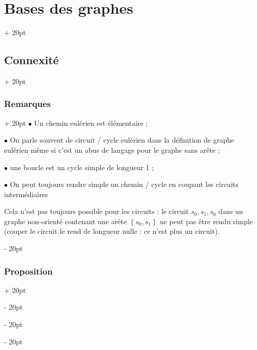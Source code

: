 \documentclass[a4paper, 12pt, twoside]{article}
\newcommand{\set}[1]{\left\{ #1 \right\}}
\newcommand{\ind}[1][20pt]{\advance\leftskip + #1}
\newcommand{\deind}[1][20pt]{\advance\leftskip - #1}
\newenvironment{indt}[2][20pt]{#2 \par \ind[#1]}{\par \deind} %
\begin{document}
\begin{indt}{\section{Bases des graphes}}
\begin{indt}{\subsection{Connexité}}
            \vspace{12pt}
            
            \begin{indt}{\subsubsection{Remarques}}
                $\bullet$ Un chemin eulérien est élémentaire ;

                $\bullet$ On parle souvent de circuit / cycle eulérien dans la définition de graphe eulérien même si c'est un abus de langage pour le graphe sans arête ;

                $\bullet$ une boucle est un cycle simple de longueur 1 ;

                $\bullet$ On peut toujours rendre simple un chemin / cycle en coupant les circuits intermédiaires

                \begin{center}
                \end{center}

                Cela n'est pas toujours possible pour les circuits : le circuit $s_0, s_1, s_0$ dans un graphe non-orienté contenant une arête $\set{s_0, s_1}$ ne peut pas être rendu simple (couper le circuit le rend de longueur nulle : ce n'est plus un circuit).
            \end{indt}

            \vspace{12pt}
            
            \begin{indt}{\subsubsection{Proposition}}
                \label{2.2.6}


\end{indt}
\end{indt}
\end{indt}
\end{document}
